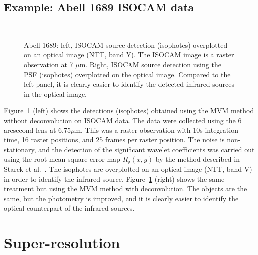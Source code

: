 \documentclass[11pt,a4paper]{article}
\begin{document}
\subsection{Example: Abell 1689 ISOCAM data}
\begin{figure}[htb]
\centerline{
\hbox{
}}
\caption{Abell 1689: left, ISOCAM source detection (isophotes) 
overplotted on an optical
image (NTT, band V). The ISOCAM image is a raster observation at 7 
$\mu$m.
Right, ISOCAM source detection using the PSF (isophotes) overplotted on 
the optical
image. Compared to the left panel, it is clearly 
easier
to identify the detected infrared sources in the optical image.} 
\label{fig_iso_abell}
\end{figure}

Figure~\ref{fig_iso_abell} (left) shows the detections (isophotes) 
obtained
using the MVM method without deconvolution on ISOCAM data. The data 
were
collected using the 6 arcsecond lens at 6.75$\mu$m. This was a raster 
observation
with 10s integration time, 16 raster positions, and 25 frames per 
raster position.
The noise is non-stationary, and the detection of the significant 
wavelet 
coefficients was carried out using the root mean square 
error map $R_\sigma(x,y)$ 
by the method described 
in Starck et al.\ \cite*{starck:sta99_4}.
The isophotes are overplotted on an optical image (NTT, band V) in order
to identify the infrared source. 
Figure~\ref{fig_iso_abell} (right) shows the same treatment but using 
the
MVM method with deconvolution. The objects are the same, but the 
photometry
is improved, and it is clearly easier to identify the optical 
counterpart
of the infrared sources.


\section{Super-resolution}
\end{document}
